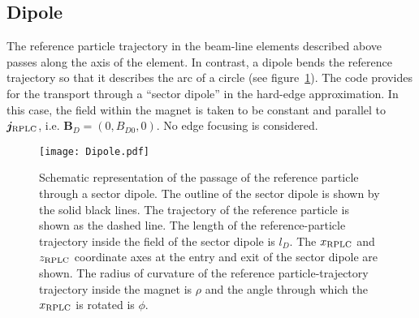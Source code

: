 \subsection{Dipole}

The reference particle trajectory in the beam-line elements described
above passes along the axis of the element.
In contrast, a dipole bends the reference trajectory so that it
describes the arc of a circle (see figure~\ref{fig:Dipole}).
The code provides for the transport through a ``sector dipole'' in the
hard-edge approximation.
In this case, the field within the magnet is taken to be constant and
parallel to $\bm{j}_{\rm RPLC}$, i.e. $\bm{B}_D = (0, B_{D0}, 0)$. 
No edge focusing is considered.
\begin{figure}
  \begin{center}
    \texttt{[image: Dipole.pdf]}
  \end{center}
  \caption{
    Schematic representation of the passage of the reference particle
    through a sector dipole.
    The outline of the sector dipole is shown by the solid black
    lines.
    The trajectory of the reference particle is shown as the dashed
    line.
    The length of the reference-particle trajectory inside the field
    of the sector dipole is $l_D$.
    The $x_{\rm RPLC}$ and $z_{\rm RPLC}$ coordinate axes at the entry
    and exit of the sector dipole are shown.
    The radius of curvature of the reference particle-trajectory
    trajectory inside the magnet is $\rho$ and the angle through which
    the $x_{\rm RPLC}$ is rotated is $\phi$.
  }
  \label{fig:Dipole}
\end{figure}

